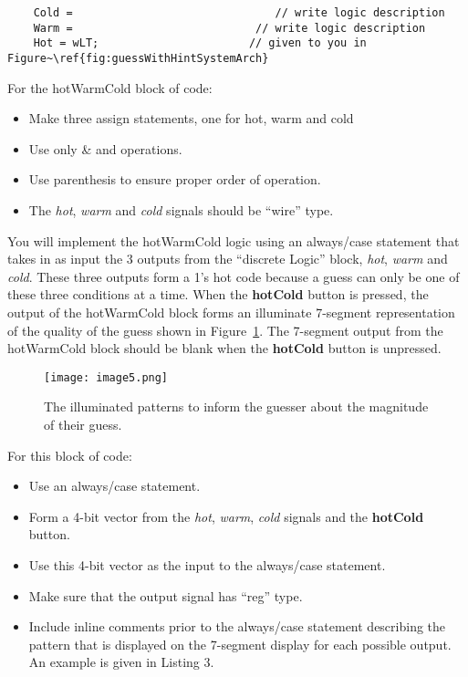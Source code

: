 \protect\hypertarget{hotWarmCold_Logic}{}{}
\begin{verbatim}
	Cold =                               // write logic description
	Warm =                            // write logic description
	Hot = wLT;                       // given to you in  Figure~\ref{fig:guessWithHintSystemArch}
\end{verbatim}

For the hotWarmCold block of code:

\begin{itemize}
\item
  Make three assign statements, one for hot, warm and cold
\item
  Use only \& and \textbar{} operations.
\item
  Use parenthesis to ensure proper order of operation.
\item
  The \emph{hot}, \emph{warm} and \emph{cold} signals should be ``wire''
  type.
\end{itemize}

You will implement the hotWarmCold logic using an always/case statement
that takes in as input the 3 outputs from the ``discrete Logic'' block,
\emph{hot}, \emph{warm} and \emph{cold}. These three outputs form a 1's
hot code because a guess can only be one of these three conditions at a
time. When the \textbf{hotCold} button is pressed, the output of the
hotWarmCold block forms an illuminate 7-segment representation of the
quality of the guess shown in Figure~\ref{figure:hiLoHintSevenSeg}. The 
7-segment output from the
hotWarmCold block should be blank when the \textbf{hotCold} button is
unpressed.

\begin{figure}[ht]
\texttt{[image:  image5.png]}
\caption{The illuminated patterns to inform the guesser about the magnitude of their guess.}
\label{figure:hiLoHintSevenSeg}
\end{figure}

For this block of code:

\begin{itemize}
\item
  Use an always/case statement.
\item
  Form a 4-bit vector from the \emph{hot}, \emph{warm}, \emph{cold}
  signals and the \textbf{hotCold} button.
\item
  Use this 4-bit vector as the input to the always/case statement.
\item
  Make sure that the output signal has ``reg'' type.
\item
  Include inline comments prior to the always/case statement describing
  the pattern that is displayed on the 7-segment display for each
  possible output. An example is given in Listing 3.
\end{itemize}

